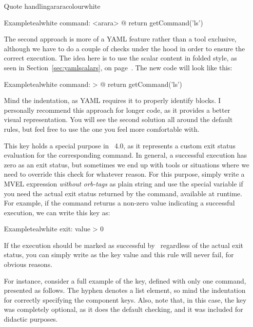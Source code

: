 \begin{description}
\begin{description}
\begin{messagebox}{Quote handling}{araracolour}{\icinfo}{white}
\begin{codebox}{Example}{teal}{\icnote}{white}
command: <arara> @{ return getCommand('ls') }
\end{codebox}

The second approach is more of a \gls{YAML} feature rather than a tool exclusive, although we have to do a couple of checks under the hood in order to ensure the correct execution. The idea here is to use the scalar content in folded style, as seen in Section~\ref{sec:yamlscalars}, on page~\pageref{sec:yamlscalars}. The new code will look like this:

\begin{codebox}{Example}{teal}{\icnote}{white}
command: >
  @{
    return getCommand('ls')
  }
\end{codebox}

Mind the indentation, as \gls{YAML} requires it to properly identify blocks. I personally recommend this approach for longer code, as it provides a better visual representation. You will see the second solution all around the default rules, but feel free to use the one you feel more comfortable with.
\end{messagebox}

\item[\describecontext{O}{commands}{exit}] This key holds a special purpose in \arara\ 4.0, as it represents a custom exit status evaluation for the corresponding command. In general, a successful execution has zero as an exit status, but sometimes we end up with tools or situations where we need to override this check for whatever reason. For this purpose, simply write a \gls{MVEL} expression \emph{without \glspl{orb-tag}} as plain string and use the special variable  if you need the actual exit status returned by the command, available at runtime. For example, if the command returns a non-zero value indicating a successful execution, we can write this key as:

\begin{codebox}{Example}{teal}{\icnote}{white}
exit: value > 0
\end{codebox}

If the execution should be marked as successful by \arara\ regardless of the actual exit status, you can simply write  as the key value and this rule will never fail, for obvious reasons.
\end{description}

For instance, consider a full example of the  key, defined with only one command, presented as follows. The hyphen denotes a list element, so mind the indentation for correctly specifying the component keys. Also, note that, in this case, the  key was completely optional, as it does the default checking, and it was included for didactic purposes.


\end{description}
